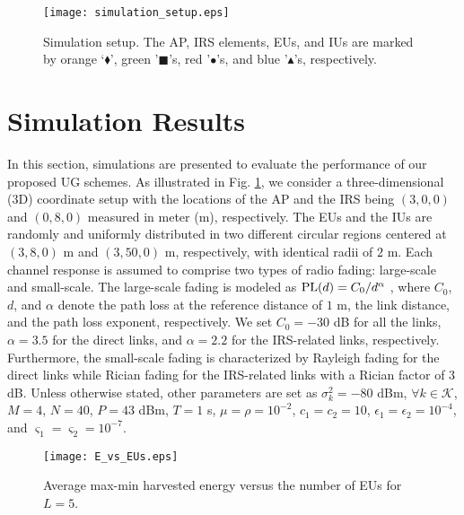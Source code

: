 \documentclass[12pt,draftclsnofoot, onecolumn]{IEEEtran}
\theoremstyle{plain}
\begin{document}
\begin{sloppypar}
\begin{figure}[!t]
	\centering
	\texttt{[image: simulation\_setup.eps]}
	\caption{Simulation setup. The AP, IRS elements, EUs, and IUs are marked by orange `$\blacklozenge$', green '$\blacksquare$'s, red '$\bullet$'s, and blue '$\blacktriangle$'s, respectively.} \label{Fig:simulation_setup}
	\vspace{-2mm}
\end{figure}

\section{Simulation Results}\label{Sec:simulation}
In this section, simulations are presented to evaluate the performance of our proposed UG schemes. As illustrated in Fig. \ref{Fig:simulation_setup}, we consider a three-dimensional (3D) coordinate setup with the locations of the AP and the IRS being $\left(3, 0, 0\right)$ and $\left(0, 8, 0 \right)$ measured in meter (m), respectively. The EUs and the IUs are randomly and uniformly distributed in two different circular regions centered at $\left(3, 8, 0\right)$ m and $\left(3, 50, 0\right)$ m, respectively, with identical radii of $2$ m. Each channel response is assumed to comprise two types of radio fading: large-scale and small-scale. The large-scale fading is modeled as ${\rm PL}(d) = C_0/d^{\alpha}$ \cite{2019_Qingqing_Joint}, where $C_0$, $d$, and $\alpha$ denote the path loss at the reference distance of $1$ m, the link distance, and the path loss exponent, respectively. We set $C_0 = -30$ dB for all the links, $\alpha = 3.5$ for the direct links, and $\alpha = 2.2$ for the IRS-related links, respectively. Furthermore, the small-scale fading is characterized by Rayleigh fading for the direct links while Rician fading for the IRS-related links with a Rician factor of $3$ dB. Unless otherwise stated, other parameters are set as $\sigma_k^2 = -80$ dBm, $\forall k\in \mathcal K$, $M = 4$, $N = 40$, $P = 43$ dBm, $T = 1$ s, $\mu = \rho = 10^{-2}$, $c_1 = c_2 = 10$, $\epsilon_1 = \epsilon_2 = 10^{-4}$, and $\varsigma_1 = \varsigma_2 = 10^{-7}$. %

\begin{figure}[!t]
	\centering
	\texttt{[image: E\_vs\_EUs.eps]}\vspace{-1.5mm}
	\caption{Average max-min harvested energy versus the number of EUs for $L = 5$.}
	\label{fig:E_vs_EUs}
	\vspace{-3mm}
\end{figure}


\end{sloppypar}
\end{document}
